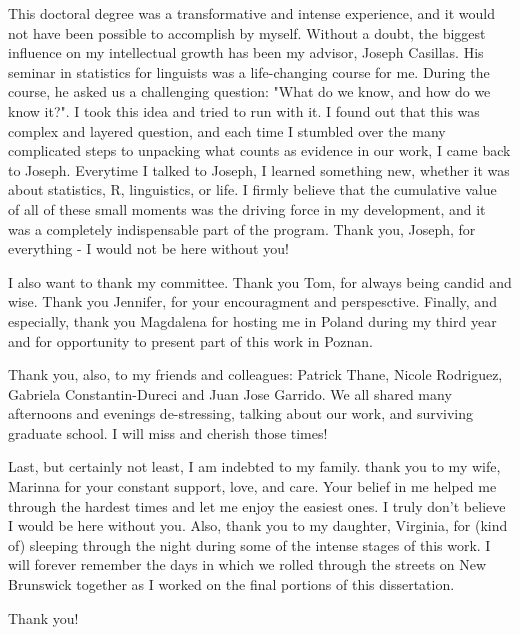 This doctoral degree was a transformative and intense experience, and it would not have been possible to accomplish by myself.
Without a doubt, the biggest influence on my intellectual growth has been my advisor, Joseph Casillas. 
His seminar in statistics for linguists was a life-changing course for me.
During the course, he asked us a challenging question: "What do we know, and how do we know it?". 
I took this idea and tried to run with it.
I found out that this was complex and layered question, and each time I stumbled over the many complicated steps to unpacking what counts as evidence in our work, I came back to Joseph. 
Everytime I talked to Joseph, I learned something new, whether it was about statistics, R, linguistics, or life.
I firmly believe that the cumulative value of all of these small moments was the driving force in my development, and it was a completely indispensable part of the program.
Thank you, Joseph, for everything - I would not be here without you!

I also want to thank my committee. Thank you Tom, for always being candid and wise. Thank you Jennifer, for your encouragment and perspesctive. Finally, and especially, thank you Magdalena for hosting me in Poland during my third year and for opportunity to present part of this work in Poznan. 

Thank you, also, to my friends and colleagues: Patrick Thane, Nicole Rodriguez, Gabriela Constantin-Dureci and Juan Jose Garrido. We all shared many afternoons and evenings de-stressing, talking about our work, and surviving graduate school. I will miss and cherish those times!

Last, but certainly not least, I am indebted to my family.
thank you to my wife, Marinna for your constant support, love, and care.
Your belief in me helped me through the hardest times and let me enjoy the easiest ones.
I truly don't believe I would be here without you.
Also, thank you to my daughter, Virginia, for (kind of) sleeping through the night during some of the intense stages of this work.
I will forever remember the days in which we rolled through the streets on New Brunswick together as I worked on the final portions of this dissertation. 

Thank you! 
